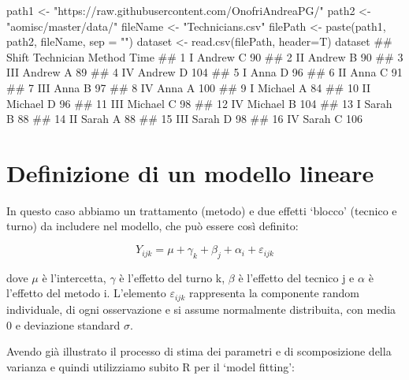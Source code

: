 \documentclass[a4paper,12pt,oneside]{book}
\newenvironment{Shaded}{}{}
\newcommand{\KeywordTok}[1]{#1}
\newcommand{\DataTypeTok}[1]{#1}
\newcommand{\StringTok}[1]{#1}
\newcommand{\CommentTok}[1]{#1}
\newcommand{\NormalTok}[1]{#1}
\begin{document}
\begin{Shaded}
\begin{Highlighting}[]
\NormalTok{path1 <-}\StringTok{ "https://raw.githubusercontent.com/OnofriAndreaPG/"}
\NormalTok{path2 <-}\StringTok{ "aomisc/master/data/"}
\NormalTok{fileName <-}\StringTok{ "Technicians.csv"}
\NormalTok{filePath <-}\StringTok{ }\KeywordTok{paste}\NormalTok{(path1, path2, fileName, }\DataTypeTok{sep =} \StringTok{""}\NormalTok{)}
\NormalTok{dataset <-}\StringTok{ }\KeywordTok{read.csv}\NormalTok{(filePath, }\DataTypeTok{header=}\NormalTok{T)}
\NormalTok{dataset}
\CommentTok{##    Shift Technician Method Time}
\CommentTok{## 1      I     Andrew      C   90}
\CommentTok{## 2     II     Andrew      B   90}
\CommentTok{## 3    III     Andrew      A   89}
\CommentTok{## 4     IV     Andrew      D  104}
\CommentTok{## 5      I       Anna      D   96}
\CommentTok{## 6     II       Anna      C   91}
\CommentTok{## 7    III       Anna      B   97}
\CommentTok{## 8     IV       Anna      A  100}
\CommentTok{## 9      I    Michael      A   84}
\CommentTok{## 10    II    Michael      D   96}
\CommentTok{## 11   III    Michael      C   98}
\CommentTok{## 12    IV    Michael      B  104}
\CommentTok{## 13     I      Sarah      B   88}
\CommentTok{## 14    II      Sarah      A   88}
\CommentTok{## 15   III      Sarah      D   98}
\CommentTok{## 16    IV      Sarah      C  106}
\end{Highlighting}
\end{Shaded}

\hypertarget{definizione-di-un-modello-lineare-2}{%
\section{Definizione di un modello lineare}\label{definizione-di-un-modello-lineare-2}}

In questo caso abbiamo un trattamento (metodo) e due effetti `blocco' (tecnico e turno) da includere nel modello, che può essere così definito:

\[Y_{ijk} = \mu + \gamma_k + \beta_j + \alpha_i + \varepsilon_{ijk}\]

dove \(\mu\) è l'intercetta, \(\gamma\) è l'effetto del turno k, \(\beta\) è l'effetto del tecnico j e \(\alpha\) è l'effetto del metodo i. L'elemento \(\varepsilon_{ijk}\) rappresenta la componente random individuale, di ogni osservazione e si assume normalmente distribuita, con media 0 e deviazione standard \(\sigma\).

Avendo già illustrato il processo di stima dei parametri e di scomposizione della varianza e quindi utilizziamo subito R per il `model fitting':
\end{document}
